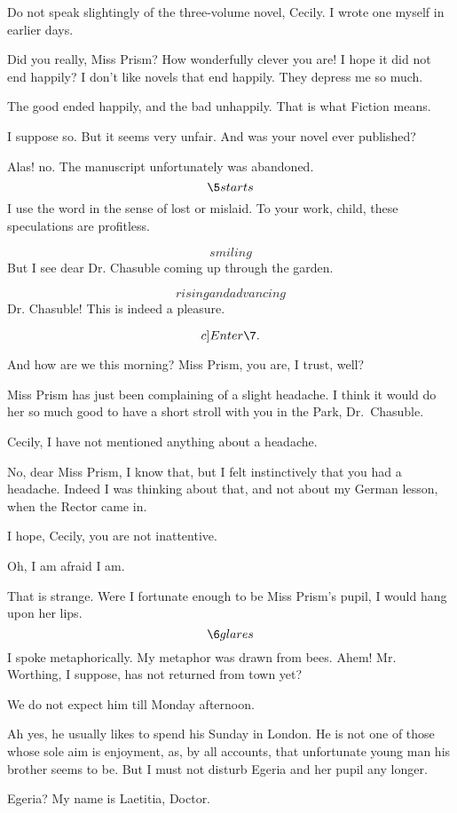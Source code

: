 \documentclass{book}
\begin{document}
\6  Do not speak slightingly of the three-volume novel,
Cecily.  I wrote one myself in earlier days.

\5  Did you really, Miss Prism?  How wonderfully clever you
are!  I hope it did not end happily?  I don't like novels that end
happily.  They depress me so much.

\6  The good ended happily, and the bad unhappily.  That
is what Fiction means.

\5  I suppose so.  But it seems very unfair.  And was your
novel ever published?

\6  Alas! no.  The manuscript unfortunately was abandoned. \hfill\break
\[\5 starts\]
I use the word in the sense of lost or mislaid.
To your work, child, these speculations are profitless.

\5  \[smiling\]  But I see dear Dr. Chasuble coming up through
the garden.


\6  \[rising and advancing\]  Dr. Chasuble!  This is indeed
a pleasure.

\[c]Enter \7.\]

\7 And how are we this morning?  Miss Prism, you are, I
trust, well?

\5  Miss Prism has just been complaining of a slight headache.
I think it would do her so much good to have a short stroll with
you in the Park, Dr.~Chasuble.

\6  Cecily, I have not mentioned anything about a
headache.

\5  No, dear Miss Prism, I know that, but I felt instinctively
that you had a headache.  Indeed I was thinking about that, and not
about my German lesson, when the Rector came in.

\7  I hope, Cecily, you are not inattentive.

\5  Oh, I am afraid I am.

{
\7  That is strange.  Were I fortunate enough to be Miss\break
Prism's pupil, I would hang upon her lips. \[\6 glares\]
I spoke metaphorically. \textemdash My metaphor was drawn from bees.  Ahem!
Mr. Worthing, I suppose, has not returned from town yet?
}

\6  We do not expect him till Monday afternoon.

\7  Ah yes, he usually likes to spend his Sunday in London.
He is not one of those whose sole aim is enjoyment, as, by all
accounts, that unfortunate young man his brother seems to be.  But
I must not disturb Egeria and her pupil any longer.

\6  Egeria?  My name is Laetitia, Doctor.
\end{document}
